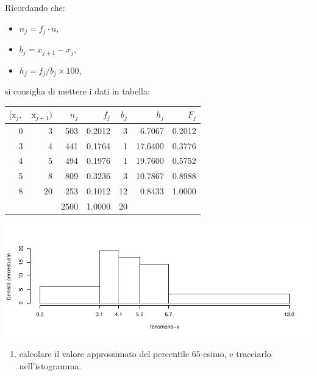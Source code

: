 \documentclass[
  11pt,
]{book}
\providecommand{\tightlist}{%
  \setlength{\itemsep}{0pt}\setlength{\parskip}{0pt}}
\theoremstyle{mytheoremstyle}
\theoremstyle{mydefstyle}
\newenvironment{sol}
  {
  \begin{tcolorbox}[enhanced,breakable,arc=0.1mm,boxrule=1pt,colback=white,colframe=iblue,
  title=\bf \fontfamily{lmss}\selectfont \hspace{.5 cm} Soluzione,drop fuzzy shadow]

}{
\end{tcolorbox}
  }
\begin{document}
\begin{sol}

Ricordando che:

\begin{itemize}
\tightlist
\item
  \(n_j=f_j\cdot n\),
\item
  \(b_j=x_{j+1}-x_{j}\),
\item
  \(h_j=f_j/b_j\times 100\),
\end{itemize}

si consiglia di mettere i dati in tabella:

\begin{table}[H]
\centering
\begin{tabular}{rrrrrrr}
\toprule
$[\text{x}_j,$ & $\text{x}_{j+1})$ & $n_j$ & $f_j$ & $b_j$ & $h_j$ & $F_j$\\
\midrule
0 & 3 & 503 & 0.2012 & 3 & 6.7067 & 0.2012\\
3 & 4 & 441 & 0.1764 & 1 & 17.6400 & 0.3776\\
4 & 5 & 494 & 0.1976 & 1 & 19.7600 & 0.5752\\
5 & 8 & 809 & 0.3236 & 3 & 10.7867 & 0.8988\\
8 & 20 & 253 & 0.1012 & 12 & 0.8433 & 1.0000\\
 &  & 2500 & 1.0000 & 20 &  & \\
\bottomrule
\end{tabular}
\end{table}

\begin{center}\includegraphics{Esami_passati_con_soluzioni_files/figure-latex/4-1} \end{center}

\end{sol}

\begin{enumerate}
\def\labelenumi{\alph{enumi}.}
\setcounter{enumi}{1}
\tightlist
\item
  calcolare il valore approssimato del percentile \(65\)-esimo, e tracciarlo nell'istogramma.
\end{enumerate}
\end{document}
